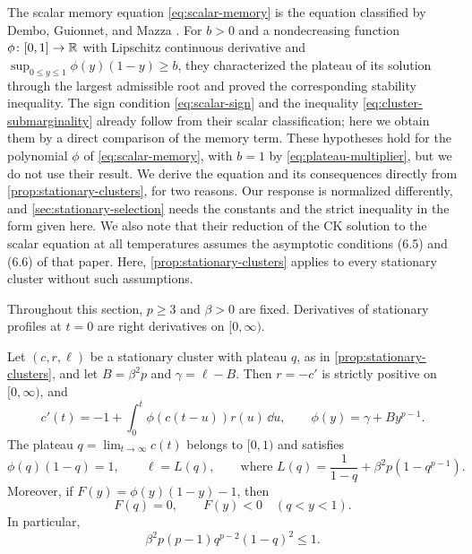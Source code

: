 The scalar memory equation \eqref{eq:scalar-memory} is the equation classified by Dembo, Guionnet, and Mazza \cite[arXiv version~1, Proposition~1.4, p.~5, and Section~5, pp.~17--20]{dgm2007}. For $b>0$ and a nondecreasing function $\phi\colon[0,1]\to\mathbb R$ with Lipschitz continuous derivative and $\sup_{0\le y\le1}\phi(y)(1-y)\ge b$, they characterized the plateau of its solution through the largest admissible root and proved the corresponding stability inequality. The sign condition \eqref{eq:scalar-sign} and the inequality \eqref{eq:cluster-submarginality} already follow from their scalar classification; here we obtain them by a direct comparison of the memory term. These hypotheses hold for the polynomial $\phi$ of \eqref{eq:scalar-memory}, with $b=1$ by \eqref{eq:plateau-multiplier}, but we do not use their result. We derive the equation and its consequences directly from \cref{prop:stationary-clusters}, for two reasons. Our response is normalized differently, and \cref{sec:stationary-selection} needs the constants and the strict inequality in the form given here. We also note that their reduction of the CK solution to the scalar equation at all temperatures \cite[arXiv version~1, Proposition~6.1, pp.~21--22]{dgm2007} assumes the asymptotic conditions (6.5) and (6.6) of that paper. Here, \cref{prop:stationary-clusters} applies to every stationary cluster without such assumptions.

Throughout this section, $p\ge3$ and $\beta>0$ are fixed. Derivatives of stationary profiles at $t=0$ are right derivatives on $[0,\infty)$.

\begin{proposition}\label{prop:scalar-clusters}
Let $(c,r,\ell)$ be a stationary cluster with plateau $q$, as in \cref{prop:stationary-clusters}, and let $B=\beta^2p$ and $\gamma=\ell-B$. Then $r=-c'$ is strictly positive on $[0,\infty)$, and
\begin{equation}
 c'(t)=-1+\int_0^t\phi(c(t-u))r(u)\,\dd u,
 \qquad \phi(y)=\gamma+By^{p-1}.
 \label{eq:scalar-memory}
\end{equation}
The plateau $q=\lim_{t\to\infty}c(t)$ belongs to $[0,1)$ and satisfies
\begin{equation}
 \phi(q)(1-q)=1,\qquad
 \ell=L(q),\qquad\text{where }L(q)=\frac1{1-q}+\beta^2p(1-q^{p-1}).
 \label{eq:plateau-multiplier}
\end{equation}
Moreover, if $F(y)=\phi(y)(1-y)-1$, then
\begin{equation}
 F(q)=0,\qquad F(y)<0\quad(q<y<1).
 \label{eq:scalar-sign}
\end{equation}
In particular,
\begin{equation}
 \beta^2p(p-1)q^{p-2}(1-q)^2\le1.
 \label{eq:cluster-submarginality}
\end{equation}
\end{proposition}

